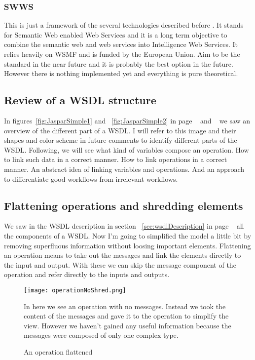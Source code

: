 \documentclass[a4paper,10pt]{article}
\begin{document}
    \subsubsection{SWWS}

    This is just a framework of the several technologies described before \cite{icec} \cite{swws}. It stands for Semantic Web enabled Web Services and it is a long term objective to combine the semantic web and web services into Intelligence Web Services. It relies heavily on WSMF and is funded by the European Union. Aim to be the standard in the near future and it is probably the best option in the future. However there is nothing implemented yet and everything is pure theoretical.\vspace{3 mm}

  \subsection{Review of a WSDL structure}

  In figures~\ref{fig:JasparSimple1} and ~\ref{fig:JasparSimple2} in page ~\pageref{fig:JasparSimple1} and ~\pageref{fig:JasparSimple2} we saw an overview of the different part of a WSDL. I will refer to this image and their shapes and color scheme in future comments to identify different parts of the WSDL. Following, we will see what kind of variables compose an operation. How to link such data in a correct manner. How to link operations in a correct manner. An abstract idea of linking variables and operations. And an approach to differentiate good workflows from irrelevant workflows.

  \subsection{Flattening operations and shredding elements}
  \label{sec:flatShred}

  We saw in the WSDL description in section ~\ref{sec:wsdlDescription} in page ~\pageref{sec:wsdlDescription} all the components of a WSDL. Now I'm going to simplified the model a little bit by removing superfluous information without loosing important elements. Flattening an operation means to take out the messages and link the elements directly to the input and output. With these we can skip the message component of the operation and refer directly to the inputs and outputs.

  \begin{figure}[H]
  {\centering
  \texttt{[image: operationNoShred.png]}
  \caption{An operation flattened} \label{fig:operationNoShred}}
  \medskip
  \small
  In here we see an operation with no messages. Instead we took the content of the messages and gave it to the operation to simplify the view. However we haven't gained any useful information because the messages were composed of only one complex type.
  \end{figure}
\end{document}
